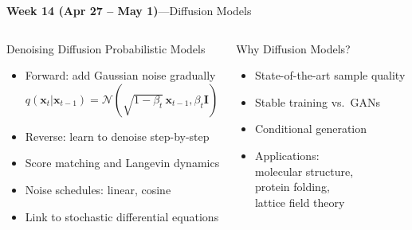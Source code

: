 \documentclass[aspectratio=169,11pt]{beamer}
\begin{document}
\begin{frame}{{\color{mlgold}\textbf{Week 14 (Apr 27 -- May 1)}\;---\;Diffusion Models}}
  \begin{columns}[T]
      \begin{block}{Denoising Diffusion Probabilistic Models}
        \begin{itemize}\itemsep1pt
          \item Forward: add Gaussian noise gradually\\
                $q(\bm{x}_t|\bm{x}_{t-1})
                 =\mathcal{N}(\sqrt{1-\beta_t}\,\bm{x}_{t-1},\beta_t\bm{I})$
          \item Reverse: learn to denoise step-by-step
          \item Score matching and Langevin dynamics
          \item Noise schedules: linear, cosine
          \item Link to stochastic differential equations
        \end{itemize}
      \end{block}
      \begin{block}{Why Diffusion Models?}
        \begin{itemize}\itemsep1pt
          \item State-of-the-art sample quality
          \item Stable training vs.\ GANs
          \item Conditional generation
          \item Applications:\\
                molecular structure,\\
                protein folding,\\
                lattice field theory
        \end{itemize}
      \end{block}
  \end{columns}
\end{frame}
\end{document}
